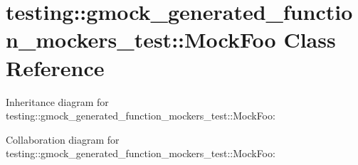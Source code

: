 \hypertarget{classtesting_1_1gmock__generated__function__mockers__test_1_1MockFoo}{}\section{testing\+:\+:gmock\+\_\+generated\+\_\+function\+\_\+mockers\+\_\+test\+:\+:Mock\+Foo Class Reference}
\label{classtesting_1_1gmock__generated__function__mockers__test_1_1MockFoo}


Inheritance diagram for testing\+:\+:gmock\+\_\+generated\+\_\+function\+\_\+mockers\+\_\+test\+:\+:Mock\+Foo\+:


Collaboration diagram for testing\+:\+:gmock\+\_\+generated\+\_\+function\+\_\+mockers\+\_\+test\+:\+:Mock\+Foo\+:
